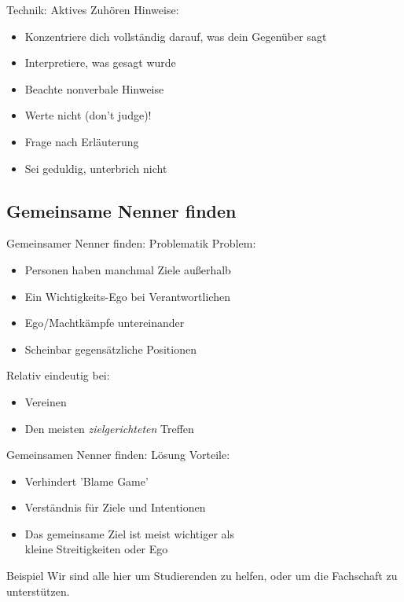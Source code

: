\begin{frame}[c]{Technik: Aktives Zuhören}
    \large
    Hinweise:
    \begin{itemize}[<+(1)->]
        \item Konzentriere dich vollständig darauf, was dein Gegenüber sagt
        \item Interpretiere, was gesagt wurde
        \item Beachte nonverbale Hinweise
        \item Werte nicht (don't judge)!
        \item Frage nach Erläuterung
        \item Sei geduldig, unterbrich nicht
    \end{itemize}
\end{frame}


\subsection{Gemeinsame Nenner finden}
\begin{frame}[c]{Gemeinsamer Nenner finden: Problematik}
    \large
    Problem:
    \begin{itemize}[<+(1)->]
        \item Personen haben manchmal Ziele außerhalb
        \item Ein Wichtigkeits-Ego bei Verantwortlichen
        \item Ego/Machtkämpfe untereinander
        \item Scheinbar gegensätzliche Positionen
    \end{itemize}
    \pause
    Relativ eindeutig bei:
    \begin{itemize}[<+(1)->]
        \item Vereinen
        \item Den meisten {\em zielgerichteten} Treffen
    \end{itemize}
\end{frame}

\begin{frame}[c]{Gemeinsamen Nenner finden: Lösung}
    \large
    Vorteile:
    \begin{itemize}[<+(1)->]
        \item Verhindert 'Blame Game'
        \item Verständnis für Ziele und Intentionen
        \item Das gemeinsame Ziel ist meist wichtiger als \\kleine Streitigkeiten oder Ego
    \end{itemize}
    \vspace{1cm}

    \pause
    \begin{block}{Beispiel}
        Wir sind alle hier um Studierenden zu helfen, oder
        um die Fachschaft zu unterstützen.
    \end{block}
\end{frame}
